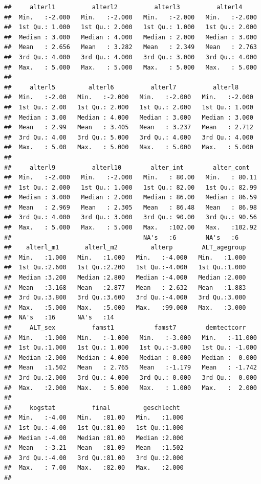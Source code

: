 \documentclass[
  doc]{apa6}
\begin{document}
\begin{verbatim}
##     alterl1          alterl2          alterl3          alterl4      
##  Min.   :-2.000   Min.   :-2.000   Min.   :-2.000   Min.   :-2.000  
##  1st Qu.: 1.000   1st Qu.: 2.000   1st Qu.: 1.000   1st Qu.: 2.000  
##  Median : 3.000   Median : 4.000   Median : 2.000   Median : 3.000  
##  Mean   : 2.656   Mean   : 3.282   Mean   : 2.349   Mean   : 2.763  
##  3rd Qu.: 4.000   3rd Qu.: 4.000   3rd Qu.: 3.000   3rd Qu.: 4.000  
##  Max.   : 5.000   Max.   : 5.000   Max.   : 5.000   Max.   : 5.000  
##                                                                     
##     alterl5         alterl6          alterl7          alterl8      
##  Min.   :-2.00   Min.   :-2.000   Min.   :-2.000   Min.   :-2.000  
##  1st Qu.: 2.00   1st Qu.: 2.000   1st Qu.: 2.000   1st Qu.: 1.000  
##  Median : 3.00   Median : 4.000   Median : 3.000   Median : 3.000  
##  Mean   : 2.99   Mean   : 3.405   Mean   : 3.237   Mean   : 2.712  
##  3rd Qu.: 4.00   3rd Qu.: 5.000   3rd Qu.: 4.000   3rd Qu.: 4.000  
##  Max.   : 5.00   Max.   : 5.000   Max.   : 5.000   Max.   : 5.000  
##                                                                    
##     alterl9          alterl10        alter_int        alter_cont    
##  Min.   :-2.000   Min.   :-2.000   Min.   : 80.00   Min.   : 80.11  
##  1st Qu.: 2.000   1st Qu.: 1.000   1st Qu.: 82.00   1st Qu.: 82.99  
##  Median : 3.000   Median : 2.000   Median : 86.00   Median : 86.59  
##  Mean   : 2.969   Mean   : 2.305   Mean   : 86.48   Mean   : 86.98  
##  3rd Qu.: 4.000   3rd Qu.: 3.000   3rd Qu.: 90.00   3rd Qu.: 90.56  
##  Max.   : 5.000   Max.   : 5.000   Max.   :102.00   Max.   :102.92  
##                                    NA's   :6        NA's   :6       
##    alterl_m1       alterl_m2         alterp        ALT_agegroup  
##  Min.   :1.000   Min.   :1.000   Min.   :-4.000   Min.   :1.000  
##  1st Qu.:2.600   1st Qu.:2.200   1st Qu.:-4.000   1st Qu.:1.000  
##  Median :3.200   Median :2.800   Median :-4.000   Median :2.000  
##  Mean   :3.168   Mean   :2.877   Mean   : 2.632   Mean   :1.883  
##  3rd Qu.:3.800   3rd Qu.:3.600   3rd Qu.:-4.000   3rd Qu.:3.000  
##  Max.   :5.000   Max.   :5.000   Max.   :99.000   Max.   :3.000  
##  NA's   :16      NA's   :14                                      
##     ALT_sex          famst1           famst7        demtectcorr     
##  Min.   :1.000   Min.   :-1.000   Min.   :-3.000   Min.   :-11.000  
##  1st Qu.:1.000   1st Qu.: 1.000   1st Qu.:-3.000   1st Qu.: -1.000  
##  Median :2.000   Median : 4.000   Median : 0.000   Median :  0.000  
##  Mean   :1.502   Mean   : 2.765   Mean   :-1.179   Mean   : -1.742  
##  3rd Qu.:2.000   3rd Qu.: 4.000   3rd Qu.: 0.000   3rd Qu.:  0.000  
##  Max.   :2.000   Max.   : 5.000   Max.   : 1.000   Max.   :  2.000  
##                                                                     
##     kogstat          final         geschlecht   
##  Min.   :-4.00   Min.   :81.00   Min.   :1.000  
##  1st Qu.:-4.00   1st Qu.:81.00   1st Qu.:1.000  
##  Median :-4.00   Median :81.00   Median :2.000  
##  Mean   :-3.21   Mean   :81.09   Mean   :1.502  
##  3rd Qu.:-4.00   3rd Qu.:81.00   3rd Qu.:2.000  
##  Max.   : 7.00   Max.   :82.00   Max.   :2.000  
## 
\end{verbatim}
\end{document}

